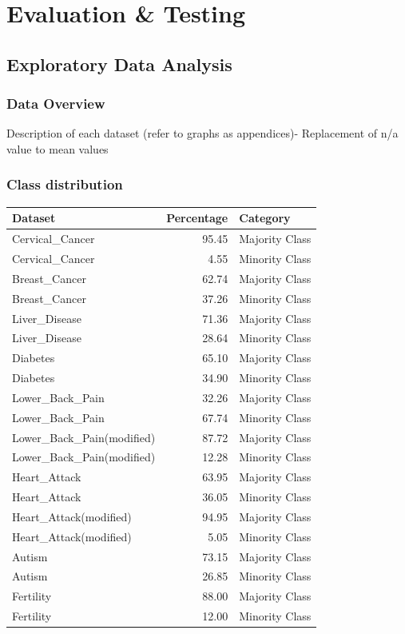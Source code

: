 \chapter{Evaluation \& Testing}\label{ch:Evaluation}

\section{Exploratory Data Analysis}
\subsection{Data Overview}
Description of each dataset (refer to graphs as appendices)- Replacement of n/a value to mean values

\subsection{Class distribution}


\begin{table}[ht]
\centering
\begin{tabular}{lrl}
  \hline
Dataset & Percentage & Category \\ 
  \hline
Cervical\_Cancer & 95.45 & Majority Class \\ 
  Cervical\_Cancer & 4.55 & Minority Class \\ 
  Breast\_Cancer & 62.74 & Majority Class \\ 
  Breast\_Cancer & 37.26 & Minority Class \\ 
  Liver\_Disease & 71.36 & Majority Class \\ 
  Liver\_Disease & 28.64 & Minority Class \\ 
  Diabetes & 65.10 & Majority Class \\ 
  Diabetes & 34.90 & Minority Class \\ 
  Lower\_Back\_Pain & 32.26 & Majority Class \\ 
  Lower\_Back\_Pain & 67.74 & Minority Class \\ 
  Lower\_Back\_Pain(modified) & 87.72 & Majority Class \\ 
  Lower\_Back\_Pain(modified) & 12.28 & Minority Class \\ 
  Heart\_Attack & 63.95 & Majority Class \\ 
  Heart\_Attack & 36.05 & Minority Class \\ 
  Heart\_Attack(modified) & 94.95 & Majority Class \\ 
  Heart\_Attack(modified) & 5.05 & Minority Class \\ 
  Autism & 73.15 & Majority Class \\ 
  Autism & 26.85 & Minority Class \\ 
  Fertility & 88.00 & Majority Class \\ 
  Fertility & 12.00 & Minority Class \\ 
   \hline
\end{tabular}
\end{table}


